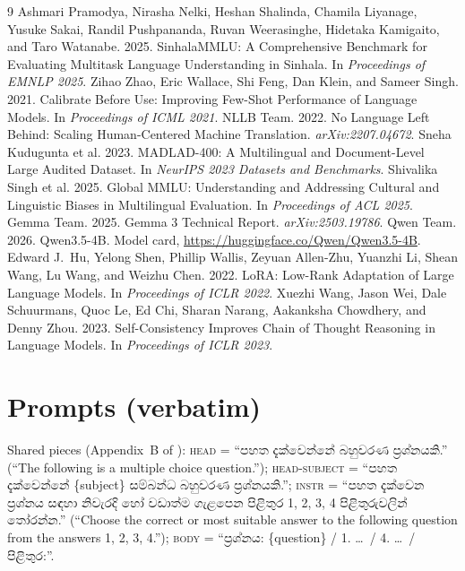 \documentclass[10pt,a4paper]{article}
\newcommand{\si}[1]{{\sinhalafont #1}}
\begin{document}
\begin{thebibliography}{9}
 Ashmari Pramodya, Nirasha Nelki, Heshan Shalinda, Chamila Liyanage, Yusuke Sakai, Randil
Pushpananda, Ruvan Weerasinghe, Hidetaka Kamigaito, and Taro Watanabe. 2025. SinhalaMMLU: A Comprehensive Benchmark
for Evaluating Multitask Language Understanding in Sinhala. In \emph{Proceedings of EMNLP 2025}.
 Zihao Zhao, Eric Wallace, Shi Feng, Dan Klein, and Sameer Singh. 2021. Calibrate Before Use:
Improving Few-Shot Performance of Language Models. In \emph{Proceedings of ICML 2021}.
 NLLB Team. 2022. No Language Left Behind: Scaling Human-Centered Machine Translation.
\emph{arXiv:2207.04672}.
 Sneha Kudugunta et al. 2023. MADLAD-400: A Multilingual and Document-Level Large Audited Dataset.
In \emph{NeurIPS 2023 Datasets and Benchmarks}.
 Shivalika Singh et al. 2025. Global MMLU: Understanding and Addressing Cultural and Linguistic
Biases in Multilingual Evaluation. In \emph{Proceedings of ACL 2025}.
 Gemma Team. 2025. Gemma 3 Technical Report. \emph{arXiv:2503.19786}.
 Qwen Team. 2026. Qwen3.5-4B. Model card, \url{https://huggingface.co/Qwen/Qwen3.5-4B}.
 Edward J.\ Hu, Yelong Shen, Phillip Wallis, Zeyuan Allen-Zhu, Yuanzhi Li, Shean Wang, Lu Wang,
and Weizhu Chen. 2022. LoRA: Low-Rank Adaptation of Large Language Models. In \emph{Proceedings of ICLR 2022}.
 Xuezhi Wang, Jason Wei, Dale Schuurmans, Quoc Le, Ed Chi, Sharan Narang, Aakanksha Chowdhery, and
Denny Zhou. 2023. Self-Consistency Improves Chain of Thought Reasoning in Language Models. In \emph{Proceedings of
ICLR 2023}.
\end{thebibliography}

\appendix
\section{Prompts (verbatim)}\label{app:prompts}
Shared pieces (Appendix~B of \cite{pramodya2025}): \textsc{head} = ``\si{පහත දැක්වෙන්නේ බහුවරණ ප්‍රශ්නයකි.}''
(``The following is a multiple choice question.''); \textsc{head-subject} = ``\si{පහත දැක්වෙන්නේ} \{subject\}
\si{සම්බන්ධ බහුවරණ ප්‍රශ්නයකි.}''; \textsc{instr} = ``\si{පහත දැක්වෙන ප්‍රශ්නය සඳහා නිවැරදි හෝ වඩාත්ම ගැළපෙන පිළිතුර
1, 2, 3, 4 පිළිතුරුවලින් තෝරන්න.}'' (``Choose the correct or most suitable answer to the following question from the
answers 1, 2, 3, 4.''); \textsc{body} = ``\si{ප්‍රශ්නය}: \{question\} / 1. \ldots\ / 4. \ldots\ / \si{පිළිතුර}:''.
\end{document}

